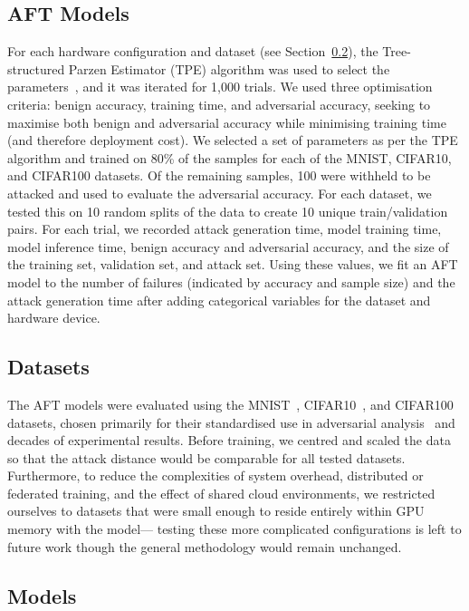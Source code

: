 \documentclass[conference]{IEEEtran}%
\begin{document}
\subsection{AFT Models}

For each hardware configuration and dataset (see Section~\ref{datasets}), the Tree-structured Parzen Estimator (TPE) algorithm was used to select the parameters~\cite{ozaki2020multiobjective,zitzler2008quality}, and it was iterated for 1,000 trials.
We used three optimisation criteria: benign accuracy, training time, and adversarial accuracy, seeking to maximise both benign and adversarial accuracy while minimising training time (and therefore deployment cost). 
We selected a set of parameters as per the TPE algorithm and trained on 80\% of the samples for each of the MNIST, CIFAR10, and CIFAR100 datasets. 
Of the remaining samples, 100 were withheld to be attacked and used to evaluate the adversarial accuracy. 
For each dataset, we tested this on 10 random splits of the data to create 10 unique train/validation pairs. 
For each trial, we recorded attack generation time, model training time, model inference time, benign accuracy and adversarial accuracy, and the size of the training set, validation set, and attack set. 
Using these values, we fit an AFT model to the number of failures (indicated by accuracy and sample size) and the attack generation time after adding categorical variables for the dataset and hardware device.


\subsection{Datasets}
\label{datasets}
The AFT models were evaluated using the MNIST~\cite{mnist}, CIFAR10~\cite{cifar}, and CIFAR100~\cite{cifar} datasets, chosen primarily for their standardised use in adversarial analysis~\cite{madry2017towards,croce_reliable_2020,carlini_towards_2017,deepfool} and decades of experimental results.
Before training, we centred and scaled the data so that the attack distance would be comparable for all tested datasets. 
Furthermore, to reduce the complexities of system overhead, distributed or federated training, and the effect of shared cloud environments, we restricted ourselves to datasets that were small enough to reside entirely within GPU memory with the model--- testing these more complicated configurations is left to future work though the general methodology would remain unchanged.

\subsection{Models}
\end{document}
